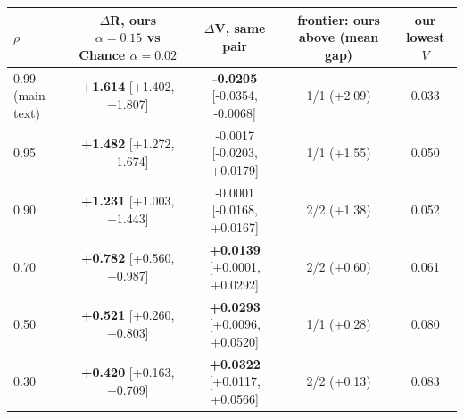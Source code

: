 \begin{tabular}{lcccc}
\toprule
$\rho$ & $\Delta$R, ours $\alpha{=}0.15$ vs Chance $\alpha{=}0.02$ & $\Delta$V, same pair & frontier: ours above (mean gap) & our lowest $V$ \\
\midrule
0.99 (main text) & \textbf{+1.614} [+1.402, +1.807] & \textbf{-0.0205} [-0.0354, -0.0068] & 1/1 (+2.09) & 0.033 \\
0.95 & \textbf{+1.482} [+1.272, +1.674] & -0.0017 [-0.0203, +0.0179] & 1/1 (+1.55) & 0.050 \\
0.90 & \textbf{+1.231} [+1.003, +1.443] & -0.0001 [-0.0168, +0.0167] & 2/2 (+1.38) & 0.052 \\
0.70 & \textbf{+0.782} [+0.560, +0.987] & \textbf{+0.0139} [+0.0001, +0.0292] & 2/2 (+0.60) & 0.061 \\
0.50 & \textbf{+0.521} [+0.260, +0.803] & \textbf{+0.0293} [+0.0096, +0.0520] & 1/1 (+0.28) & 0.080 \\
0.30 & \textbf{+0.420} [+0.163, +0.709] & \textbf{+0.0322} [+0.0117, +0.0566] & 2/2 (+0.13) & 0.083 \\
\bottomrule
\end{tabular}
